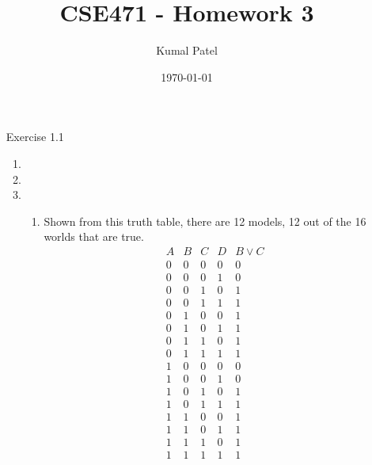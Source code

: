 \documentclass[letterpaper, 12pt]{article}
\title{CSE471 - Homework 3}
\author{Kumal Patel}
\date{\today}
\begin{document}
   
\maketitle

\begin{enumerate}
    \item[Exercise 1.1] 
        \begin{enumerate}
            \item 
            \item 
            \item 
                \begin{enumerate}
                    \item Shown from this truth table, there are 12 models, 
                    12 out of the 16 worlds that are true.
                        \begin{displaymath}
                            \begin{array}{|c|c|c|c|c|}
                                A & B & C & D & B \lor C\\
                                \hline
                                0 & 0 & 0 & 0 & 0\\
                                0 & 0 & 0 & 1 & 0\\
                                0 & 0 & 1 & 0 & 1\\
                                0 & 0 & 1 & 1 & 1\\
                                0 & 1 & 0 & 0 & 1\\
                                0 & 1 & 0 & 1 & 1\\
                                0 & 1 & 1 & 0 & 1\\
                                0 & 1 & 1 & 1 & 1\\
                                1 & 0 & 0 & 0 & 0\\
                                1 & 0 & 0 & 1 & 0\\
                                1 & 0 & 1 & 0 & 1\\
                                1 & 0 & 1 & 1 & 1\\
                                1 & 1 & 0 & 0 & 1\\
                                1 & 1 & 0 & 1 & 1\\
                                1 & 1 & 1 & 0 & 1\\
                                1 & 1 & 1 & 1 & 1\\
                               

\end{array}
\end{displaymath}
\end{enumerate}
\end{enumerate}
\end{enumerate}
\end{document}
